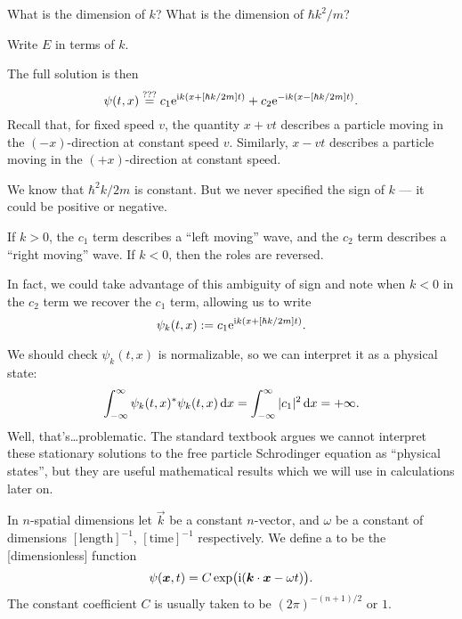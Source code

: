 \begin{exercise}\label{xca:qm:free-particle:dimension-of-k}
What is the dimension of $k$? What is the dimension of $\hbar k^{2}/m$?
\end{exercise}
\begin{exercise}
Write $E$ in terms of $k$.
\end{exercise}

The full solution is then
\begin{equation}
\psi(t,x) \stackrel{???}{=} c_{1}\mathrm{e}^{\mathrm{i} k(x + [\hbar k/2m]t)} + c_{2} \mathrm{e}^{-\mathrm{i} k(x - [\hbar k/2m]t)}.
\end{equation}
Recall that, for fixed speed $v$, the quantity $x + vt$ describes a
particle moving in the $(-x)$-direction at constant speed
$v$. Similarly, $x-vt$ describes a particle moving in the
$(+x)$-direction at constant speed.

We know that $\hbar^{2}k/2m$ is constant. But we never specified the
sign of $k$ --- it could be positive or negative.

If $k>0$, the $c_{1}$ term describes a ``left moving'' wave, and the
$c_{2}$ term describes a ``right moving'' wave.
If $k<0$, then the roles are reversed.

In fact, we could take advantage of this ambiguity of sign and note when
$k<0$ in the $c_{2}$ term we recover the $c_{1}$ term, allowing us to
write
\begin{equation}
\psi_{k}(t,x) := c_{1}\mathrm{e}^{\mathrm{i} k(x + [\hbar k/2m]t)}.
\end{equation}

We should check $\psi_{k}(t,x)$ is normalizable, so we can interpret it
as a physical state:
\begin{equation}
\int^{\infty}_{-\infty}\psi_{k}(t,x)^{*}\psi_{k}(t,x)\,\mathrm{d} x =
\int^{\infty}_{-\infty}|c_{1}|^{2}\,\mathrm{d} x = +\infty.
\end{equation}
Well, that's\dots problematic.
The standard textbook argues we cannot interpret these stationary
solutions to the free particle Schrodinger equation as ``physical states'',
but they are useful mathematical results which we will use in
calculations later on.

\begin{definition}
In $n$-spatial dimensions let $\vec{k}$ be a constant $n$-vector, and
$\omega$ be a constant of dimensions $[\mbox{length}]^{-1}$, $[\mbox{time}]^{-1}$
respectively. We define a  to be the [dimensionless] function
\begin{equation}
\psi(\boldsymbol{x}, t) = C\exp\bigl(\mathrm{i}(\boldsymbol{k}\cdot\boldsymbol{x} - \omega t)\bigr).
\end{equation}
The constant coefficient $C$ is usually taken to be $(2\pi)^{-(n+1)/2}$
or $1$.
\end{definition}

